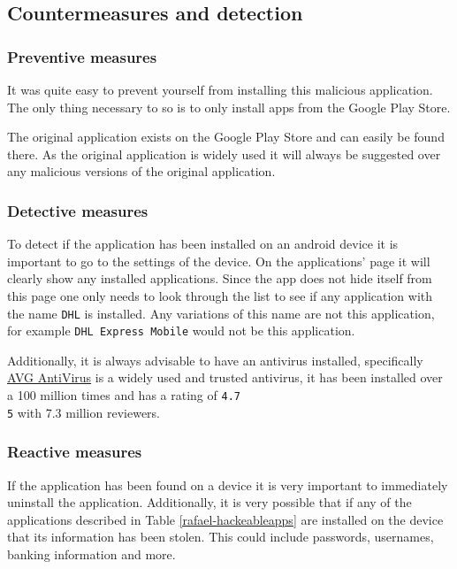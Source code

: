 \subsection{Countermeasures and detection}

\subsubsection{Preventive measures}

It was quite easy to prevent yourself from installing this malicious application.
The only thing necessary to so is to only install apps from the Google Play Store.

The original application exists on the Google Play Store and can easily be found there.
As the original application is widely used it will always be suggested over any malicious versions of the original application.

\subsubsection{Detective measures}

To detect if the application has been installed on an android device it is important to go to the settings of the device.
On the applications' page it will clearly show any installed applications.
Since the app does not hide itself from this page one only needs to look through the list to see if any application with the name \texttt{DHL} is installed.
Any variations of this name are not this application, for example \texttt{DHL Express Mobile} would not be this application.

Additionally, it is always advisable to have an antivirus installed,
specifically \href{https://play.google.com/store/apps/details?id=com.antivirus&hl=en&gl=US}{AVG AntiVirus} is a widely used and trusted antivirus,
it has been installed over a 100 million times and has a rating of \texttt{4.7\\5} with 7.3 million reviewers.

\subsubsection{Reactive measures}

If the application has been found on a device it is very important to immediately uninstall the application.
Additionally, it is very possible that if any of the applications described in Table \ref{rafael-hackeableapps} are installed on the device that its information has been stolen.
This could include passwords, usernames, banking information and more.

